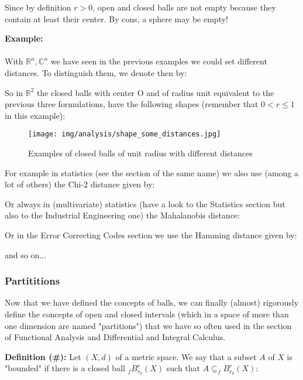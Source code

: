 	\begin{tcolorbox}[title=Remark,colframe=black,arc=10pt]
	Since by definition $r>0$, open and closed balls are not empty because they contain at least their center. By cons, a sphere may be empty!
	\end{tcolorbox}
	\begin{tcolorbox}[colframe=black,colback=white,sharp corners]
	\textbf{{\Large {}}Example:}\\\\
	With $\mathbb{R}^n,\mathbb{C}^n$ we have seen in the previous examples we could set different distances. To distinguish them, we denote then by:
	
	So in $\mathbb{R}^2$ the closed balls with center O and of radius unit equivalent to the previous three formulations, have the following shapes (remember that $0<r\leq 1$ in this example):
	\begin{figure}[H]
		\centering
		\texttt{[image: img/analysis/shape\_some\_distances.jpg]}
		\caption{Examples of closed balls of unit radius with different distances}
	\end{figure}
	\end{tcolorbox}
	For example in statistics (see the section of the same name) we also use (among a lot of others) the Chi-2 distance given by:
	
	Or always in (multivariate) statistics (have a look to the Statistics section but also to the Industrial Engineering one) the  Mahalanobis distance:
	
	Or in the Error Correcting Codes section we use the Hamming distance given by:
	
	and so on...
	
	\subsubsection{Partititions}
	Now that we have defined the concepts of balls, we can finally (almost) rigorously define the concepts of open and closed intervals (which in a space of more than one dimension are named "partitions") that we have so often used in the section of Functional Analysis and Differential and Integral Calculus.
	
	\textbf{Definition (\#\mydef):} Let $(X,d)$ of a metric space. We say that a subset $A$ of $X$ is "bounded" if there is a closed ball $_fB_{r_0}^r(X)$ such that $A \subseteq _fB_{r_0}^r(X)$:
	
